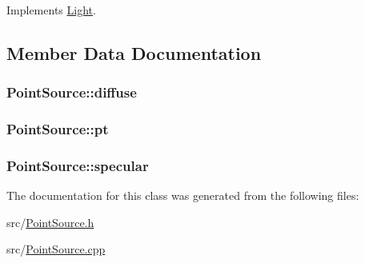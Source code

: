 Implements \hyperlink{classLight_a2a4cdf8081c2cab02757c2464610a32f}{Light}.



\subsection{Member Data Documentation}
\subsubsection[{\texorpdfstring{diffuse}{diffuse}}]{ Point\+Source\+::diffuse\hspace{0.3cm}{\ttfamily [private]}}\hypertarget{classPointSource_af56ac7fa441b50c514037dd624d7c184}{}\label{classPointSource_af56ac7fa441b50c514037dd624d7c184}
\subsubsection[{\texorpdfstring{pt}{pt}}]{ Point\+Source\+::pt\hspace{0.3cm}{\ttfamily [private]}}\hypertarget{classPointSource_a42114a0433eca4114a77a3f8cb9e41e1}{}\label{classPointSource_a42114a0433eca4114a77a3f8cb9e41e1}
\subsubsection[{\texorpdfstring{specular}{specular}}]{ Point\+Source\+::specular\hspace{0.3cm}{\ttfamily [private]}}\hypertarget{classPointSource_ae02434997baef2749ca6eaa61e98e496}{}\label{classPointSource_ae02434997baef2749ca6eaa61e98e496}


The documentation for this class was generated from the following files\+:\begin{DoxyCompactItemize}
\item 
src/\hyperlink{PointSource_8h}{Point\+Source.\+h}\item 
src/\hyperlink{PointSource_8cpp}{Point\+Source.\+cpp}\end{DoxyCompactItemize}
